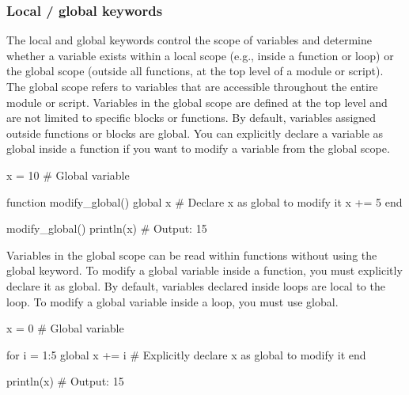 \documentclass{report}
\begin{document}
    \subsubsection{Local / global keywords}
    \bigbreak \noindent 
    The local and global keywords control the scope of variables and determine whether a variable exists within a local scope (e.g., inside a function or loop) or the global scope (outside all functions, at the top level of a module or script).
    \bigbreak \noindent 
    The global scope refers to variables that are accessible throughout the entire module or script. Variables in the global scope are defined at the top level and are not limited to specific blocks or functions.
    \bigbreak \noindent 
    By default, variables assigned outside functions or blocks are global.
    \bigbreak \noindent 
    You can explicitly declare a variable as global inside a function if you want to modify a variable from the global scope.
    \bigbreak \noindent 
    \begin{jlcode}
        x = 10  # Global variable

        function modify_global()
        global x  # Declare x as global to modify it
        x += 5
        end

        modify_global()
        println(x)  # Output: 15
    \end{jlcode}
    \bigbreak \noindent 
    Variables in the global scope can be read within functions without using the global keyword. To modify a global variable inside a function, you must explicitly declare it as global.
    \bigbreak \noindent 
    By default, variables declared inside loops are local to the loop. To modify a global variable inside a loop, you must use global.
    \bigbreak \noindent 
    \begin{jlcode}
        x = 0  # Global variable

        for i = 1:5
            global x += i  # Explicitly declare x as global to modify it
        end

        println(x)  # Output: 15
    \end{jlcode}
\end{document}
